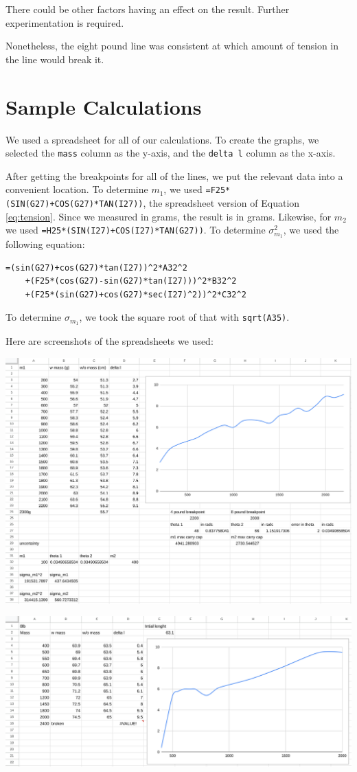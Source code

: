 \documentclass[12pt]{article}
\begin{document}
There could be other factors having an effect on the result. Further experimentation is required.

Nonetheless, the eight pound line was consistent at which amount of tension in the line would break it.
\section{Sample Calculations}
\label{sec:org3ef35c3}

We used a spreadsheet for all of our calculations. To create the graphs, we selected the \texttt{mass} column as the y-axis, and the \texttt{delta l} column as the x-axis.

After getting the breakpoints for all of the lines, we put the relevant data into a convenient location. To determine \(m_1\), we used \texttt{=F25*(SIN(G27)+COS(G27)*TAN(I27))}, the spreadsheet version of Equation \ref{eq:tension}. Since we measured in grams, the result is in grams. Likewise, for \(m_2\) we used \texttt{=H25*(SIN(I27)+COS(I27)*TAN(G27))}. To determine \(\sigma_{m_1}^2\), we used the following equation:


\begin{verbatim}
=(sin(G27)+cos(G27)*tan(I27))^2*A32^2
    +(F25*(cos(G27)-sin(G27)*tan(I27)))^2*B32^2
    +(F25*(sin(G27)+cos(G27)*sec(I27)^2))^2*C32^2
\end{verbatim}

To determine \(\sigma_{m_1}\), we took the square root of that with \texttt{sqrt(A35)}.

Here are screenshots of the spreadsheets we used:

\begin{center}
\includegraphics[width=6.5in]{./firstspread.png}
\end{center}

\begin{center}
\includegraphics[width=6.5in]{./secondspread.png}
\end{center}
\end{document}
